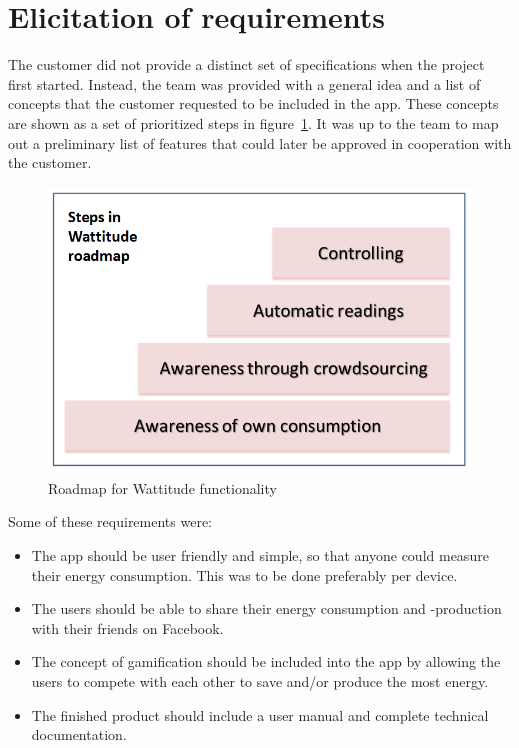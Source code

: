 \section{Elicitation of requirements}
\label{sec:obtainingreq}

The customer did not provide a distinct set of specifications when the project first started. Instead, the team was provided with a general idea and a list of concepts that the customer requested to be included in the app. These concepts are shown as a set of prioritized steps in figure~\ref{fig:roadmap}. It was up to the team to map out a preliminary list of features that could later be approved in cooperation with the customer.

\begin{figure}[H]
\centering
\includegraphics[height=0.4\textheight]{ch/specification/fig/roadmap.png}
\caption{Roadmap for Wattitude functionality}
\label{fig:roadmap}
\end{figure}

Some of these requirements were:
\begin{itemize}
\item The app should be user friendly and simple, so that anyone could measure their energy consumption. This was to be done preferably per device. 
\item The users should be able to share their energy consumption and -production with their friends on Facebook. 
\item The concept of \gls{gamification} should be included into the app by allowing the users to compete with each other to save and/or produce the most energy. 
\item The finished product should include a user manual and complete technical documentation.
\end{itemize}


